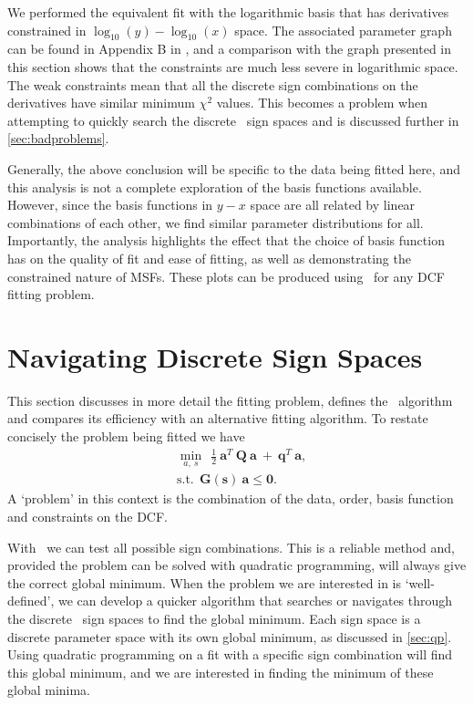 We performed the equivalent fit with the logarithmic basis that has derivatives constrained in $\log_{10}(y) - \log_{10}(x)$ space. The associated parameter graph can be found in Appendix B in \cite{Bevins_maxsmooth_2021}, and a comparison with the graph presented in this section shows that the constraints are much less severe in logarithmic space. The weak constraints mean that all the discrete sign combinations on the derivatives have similar minimum $\chi^2$ values. This becomes a problem when attempting to quickly search the discrete \maxsmooth~sign spaces and is discussed further in \cref{sec:badproblems}.

Generally, the above conclusion will be specific to the data being fitted here, and this analysis is not a complete exploration of the basis functions available. However, since the basis functions in $y - x$ space are all related by linear combinations of each other, we find similar parameter distributions for all. Importantly, the analysis highlights the effect that the choice of basis function has on the quality of fit and ease of fitting, as well as demonstrating the constrained nature of MSFs. These plots can be produced using \maxsmooth~for any DCF fitting problem.

\section{Navigating Discrete Sign Spaces}
\label{sec:Eff}

This section discusses in more detail the fitting problem, defines the \maxsmooth~algorithm and compares its efficiency with an alternative fitting algorithm. To restate concisely the problem being fitted we have
\begin{equation}
    \begin{split}
        &\min_{a,~s}~~\frac{1}{2}~\mathbf{a}^T~\mathbf{Q}~\mathbf{a}~+~\mathbf{q}^T~\mathbf{a}, \\
        &\mathrm{s.t.}~~\mathbf{G(s)~a} \leq \mathbf{0}.
    \end{split}
\end{equation} 
A `problem' in this context is the combination of the data, order, basis function and constraints on the DCF. 

With \maxsmooth~we can test all possible sign combinations. This is a reliable method and, provided the problem can be solved with quadratic programming, will always give the correct global minimum. When the problem we are interested in is `well-defined', we can develop a quicker algorithm that searches or navigates through the discrete \maxsmooth~sign spaces to find the global minimum. Each sign space is a discrete parameter space with its own global minimum, as discussed in \cref{sec:qp}. Using quadratic programming on a fit with a specific sign combination will find this global minimum, and we are interested in finding the minimum of these global minima.

